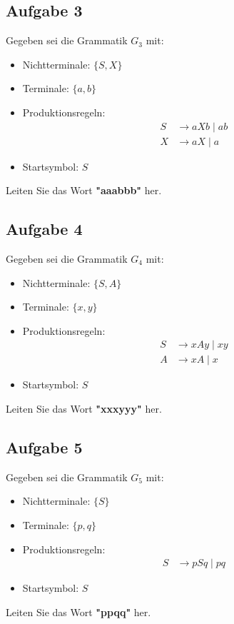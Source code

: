 \documentclass[a4paper,12pt]{article}
\begin{document}
	\subsection*{Aufgabe 3}
	Gegeben sei die Grammatik $G_3$ mit:
	\begin{itemize}
		\item Nichtterminale: $\{S, X\}$
		\item Terminale: $\{a, b\}$
		\item Produktionsregeln:
		\begin{align*}
			S &\rightarrow a X b \mid ab \\
			X &\rightarrow a X \mid a
		\end{align*}
		\item Startsymbol: $S$
	\end{itemize}
	Leiten Sie das Wort \textbf{"aaabbb"} her.
	
	\subsection*{Aufgabe 4}
	Gegeben sei die Grammatik $G_4$ mit:
	\begin{itemize}
		\item Nichtterminale: $\{S, A\}$
		\item Terminale: $\{x, y\}$
		\item Produktionsregeln:
		\begin{align*}
			S &\rightarrow x A y \mid xy \\
			A &\rightarrow x A \mid x
		\end{align*}
		\item Startsymbol: $S$
	\end{itemize}
	Leiten Sie das Wort \textbf{"xxxyyy"} her.
	
	\subsection*{Aufgabe 5}
	Gegeben sei die Grammatik $G_5$ mit:
	\begin{itemize}
		\item Nichtterminale: $\{S\}$
		\item Terminale: $\{p, q\}$
		\item Produktionsregeln:
		\begin{align*}
			S &\rightarrow p S q \mid pq
		\end{align*}
		\item Startsymbol: $S$
	\end{itemize}
	Leiten Sie das Wort \textbf{"ppqq"} her.
	
\end{document}
